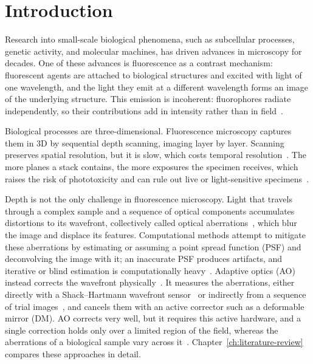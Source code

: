 \chapter{Introduction}
\label{ch:introduction}
Research into small-scale biological phenomena, such as subcellular processes, genetic activity, and molecular machines, has driven advances in microscopy for decades. One of these advances is fluorescence as a contrast mechanism: fluorescent agents are attached to biological structures and excited with light of one wavelength, and the light they emit at a different wavelength forms an image of the underlying structure. This emission is incoherent: fluorophores radiate independently, so their contributions add in intensity rather than in field~\cite{goodman2017fourierOptics}.

Biological processes are three-dimensional. Fluorescence microscopy captures them in 3D by sequential depth scanning, imaging layer by layer. Scanning preserves spatial resolution, but it is slow, which costs temporal resolution~\cite{levoy2006lightFieldMicroscopy}. The more planes a stack contains, the more exposures the specimen receives, which raises the risk of phototoxicity and can rule out live or light-sensitive specimens~\cite{sibarita2005deconvolutionMicroscopy}.

Depth is not the only challenge in fluorescence microscopy. Light that travels through a complex sample and a sequence of optical components accumulates distortions to its wavefront, collectively called optical aberrations~\cite{booth2007adaptiveOpticsMicroscopy,hampson2021adaptiveOpticsPrimer}, which blur the image and displace its features. Computational methods attempt to mitigate these aberrations by estimating or assuming a point spread function (PSF) and deconvolving the image with it; an inaccurate PSF produces artifacts, and iterative or blind estimation is computationally heavy~\cite{sibarita2005deconvolutionMicroscopy,mcnally1999deconvolutionMicroscopy3d,sarder2006deconvolutionMethods}. Adaptive optics (AO) instead corrects the wavefront physically~\cite{booth2007adaptiveOpticsMicroscopy,hampson2021adaptiveOpticsPrimer}. It measures the aberrations, either directly with a Shack--Hartmann wavefront sensor~\cite{platt2001shackHartmannHistory} or indirectly from a sequence of trial images~\cite{debarre2009imageBasedAdaptiveOptics}, and cancels them with an active corrector such as a deformable mirror (DM). AO corrects very well, but it requires this active hardware, and a single correction holds only over a limited region of the field, whereas the aberrations of a biological sample vary across it~\cite{hampson2021adaptiveOpticsPrimer,liu2018nativeStateAdaptiveOptics,furieri2022aberrationLargeField}. Chapter~\ref{ch:literature-review} compares these approaches in detail.

